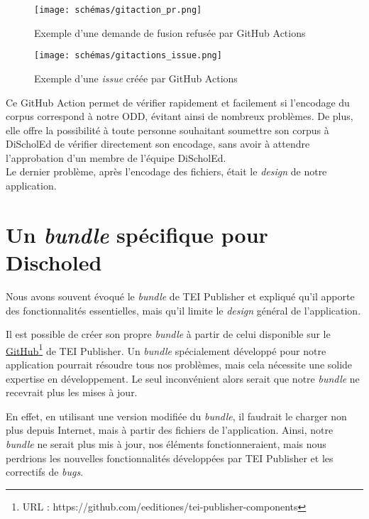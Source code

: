 \begin{figure}[H]
\centering
\texttt{[image: schémas/gitaction\_pr.png]}
\caption{Exemple d'une demande de fusion refusée par GitHub Actions}
\label{fig:schémas14}
\end{figure}

\begin{figure}[H]
\centering
\texttt{[image: schémas/gitactions\_issue.png]}
\caption{Exemple d'une \textit{issue} créée par GitHub Actions}
\label{fig:schémas15}
\end{figure}

Ce GitHub Action permet de vérifier rapidement et facilement si l'encodage du corpus correspond à notre ODD, évitant ainsi de nombreux problèmes. De plus, elle offre la possibilité à toute personne souhaitant soumettre son corpus à DiScholEd de vérifier directement son encodage, sans avoir à attendre l'approbation d'un membre de l'équipe DiScholEd.\\

Le dernier problème, après l'encodage des fichiers, était le \textit{design} de notre application.

\section{Un \textit{bundle} spécifique pour Discholed}

Nous avons souvent évoqué le \textit{bundle} de TEI Publisher et expliqué qu'il apporte des fonctionnalités essentielles, mais qu'il limite le \textit{design} général de l'application.

Il est possible de créer son propre \textit{bundle} à partir de celui disponible sur le \href{https://github.com/eeditiones/tei-publisher-components}{GitHub}\footnote{URL : https://github.com/eeditiones/tei-publisher-components} de TEI Publisher. Un \textit{bundle} spécialement développé pour notre application pourrait résoudre tous nos problèmes, mais cela nécessite une solide expertise en développement. Le seul inconvénient alors serait que notre \textit{bundle} ne recevrait plus les mises à jour.

En effet, en utilisant une version modifiée du \textit{bundle}, il faudrait le charger non plus depuis Internet, mais à partir des fichiers de l'application. Ainsi, notre \textit{bundle} ne serait plus mis à jour, nos éléments fonctionneraient, mais nous perdrions les nouvelles fonctionnalités développées par TEI Publisher et les correctifs de \textit{bugs}.
